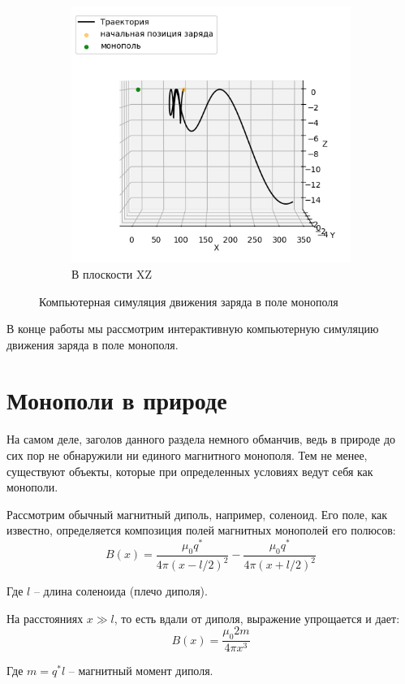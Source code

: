 \documentclass[a4paper, 12pt]{article}
\begin{document}
\begin{figure}[h]
    \begin{subfigure}{0.4\textwidth}
        \centering
        \includegraphics[width=0.8\linewidth]{simulation3.png}
        \caption{В плоскости XZ}  
    \end{subfigure}

    \caption{Компьютерная симуляция движения заряда в поле монополя}
    \label{fig:simulation}

\end{figure}

В конце работы мы рассмотрим интерактивную компьютерную симуляцию движения заряда в поле монополя.

\section{Монополи в природе}
На самом деле, заголов данного раздела немного обманчив, ведь в природе до сих пор не обнаружили ни единого магнитного монополя. Тем не менее, существуют объекты, которые при определенных условиях ведут себя как монополи. 

Рассмотрим обычный магнитный диполь, например, соленоид. Его поле, как известно, определяется композиция полей магнитных монополей его полюсов:
\[
    B(x) = \frac{\mu_0q^*}{4\pi\left(x - l/2\right)^2} - \frac{\mu_0q^*}{4\pi\left(x + l/2\right)^2}  
\]

Где $l$ -- длина соленоида (плечо диполя).

На расстояниях $x \gg l$, то есть вдали от диполя, выражение упрощается и дает:
\[
    B(x) = \frac{\mu_0 2m}{4\pi x^3}
\]

Где $m = q^*l$ -- магнитный момент диполя.
\end{document}
